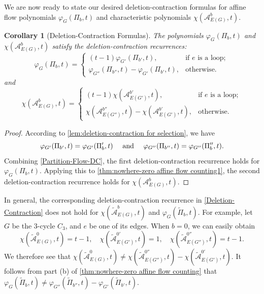 \documentclass[12pt]{article}%
\renewcommand*{\bm}[1]{#1}%
\numberwithin{equation}{section}
\def\And{\mbox{\rm ~and~}}
\newtheorem{corollary}[corollary]{Corollary}
\begin{document}
We are now ready to state our desired deletion-contraction formulas for affine flow polynomials $\varphi_G(\Pi_{\bm b},t)$ and characteristic polynomials $\chi(\mathcal{A}_{E(G)}^{\bm b},t)$.
\begin{corollary}[Deletion-Contraction Formulas]\label{Deletion-Contraction}
The polynomials $\varphi_G(\Pi_{\bm b},t)$ and $\chi(\mathcal{A}_{E(G)}^{\bm b},t)$ satisfy the deletion-contraction recurrences:
\[
\varphi_G(\Pi_{\bm b},t)=\begin{cases}
(t-1)\varphi_{G'}(\Pi_{\bm b'},t),&\text{if $e$ is a loop};\\
\varphi_{G''}(\Pi_{\bm b''},t)-\varphi_{G'}(\Pi_{\bm b'},t),&\text{otherwise}.
\end{cases}
\]
and
\[
\chi(\mathcal{A}_{E(G)}^{\bm b},t)=\begin{cases}
(t-1)\chi(\mathcal{A}_{E(G')}^{\bm b'},t),&\text{if $e$ is a loop};\\
\chi(\mathcal{A}_{E(G'')}^{\bm b''},t)-\chi(\mathcal{A}_{E(G')}^{\bm b'},t),&\text{otherwise}.
\end{cases}
\]
\end{corollary}
\begin{proof}
According to \autoref{lem:deletion-contraction for selection}, we have
\[
\varphi_{G'}(\Pi_{\bm b'},t)=\varphi_{G'}(\Pi_{\bm b}',t)\quad\And\quad \varphi_{G''}(\Pi_{\bm b''},t)=\varphi_{G''}(\Pi_{\bm b}'',t).
\]
Combining \eqref{Partition-Flow-DC}, the first deletion-contraction recurrence holds for $\varphi_G(\Pi_{\bm b},t)$. Applying this to 
 \autoref{thm:nowhere-zero affine flow counting1}, the second deletion-contraction recurrence holds for $\chi(\mathcal{A}_{E(G)}^{\bm b},t)$.
\end{proof}

In general, the corresponding deletion-contraction recurrence in \autoref{Deletion-Contraction} does not hold for $\chi(\tilde{\mathcal{A}}_{E(G)}^{\bm b},t)$ and $\varphi_G(\tilde{\Pi}_{\bm b},t)$. For example, let $G$ be the $3$-cycle $C_3$, and $e$ be one of its edges. When $\bm b=\bm 0$, we can easily obtain 
\[
\chi(\tilde{\mathcal{A}}_{E(G)}^{\bm 0},t)=t-1,\quad \chi(\tilde{\mathcal{A}}_{E(G')}^{\bm 0'},t)=1,\quad \chi(\tilde{\mathcal{A}}_{E(G'')}^{\bm 0''},t)=t-1.
\]
We therefore see that $\chi(\tilde{\mathcal{A}}_{E(G)}^{\bm 0},t)\ne \chi(\tilde{\mathcal{A}}_{E(G'')}^{\bm 0''},t)-\chi(\tilde{\mathcal{A}}_{E(G')}^{\bm 0'},t)$. It follows from part (b) of \autoref{thm:nowhere-zero affine flow counting} that $\varphi_G(\tilde{\Pi}_{\bm b},t)\ne\varphi_{G''}(\tilde{\Pi}_{\bm b''},t)-\varphi_{G'}(\tilde{\Pi}_{\bm b'},t)$.
\end{document}
